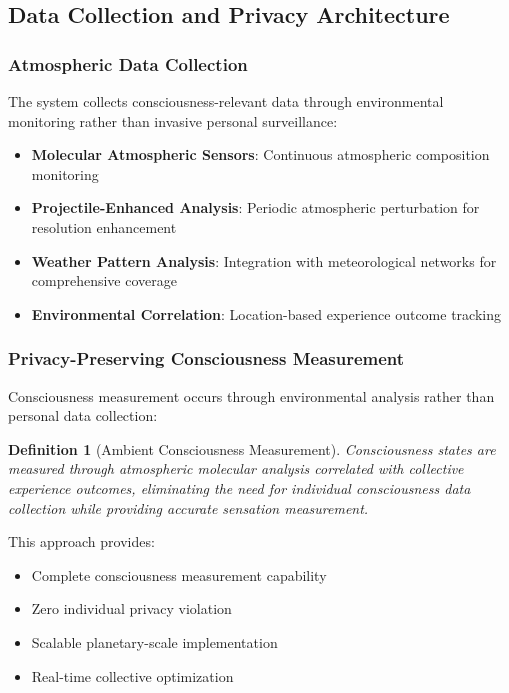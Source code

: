 \documentclass[12pt,a4paper]{article}
\newtheorem{definition}{Definition}
\begin{document}
\subsection{Data Collection and Privacy Architecture}

\subsubsection{Atmospheric Data Collection}

The system collects consciousness-relevant data through environmental monitoring rather than invasive personal surveillance:

\begin{itemize}
\item \textbf{Molecular Atmospheric Sensors}: Continuous atmospheric composition monitoring
\item \textbf{Projectile-Enhanced Analysis}: Periodic atmospheric perturbation for resolution enhancement  
\item \textbf{Weather Pattern Analysis}: Integration with meteorological networks for comprehensive coverage
\item \textbf{Environmental Correlation}: Location-based experience outcome tracking
\end{itemize}

\subsubsection{Privacy-Preserving Consciousness Measurement}

Consciousness measurement occurs through environmental analysis rather than personal data collection:

\begin{definition}[Ambient Consciousness Measurement]
Consciousness states are measured through atmospheric molecular analysis correlated with collective experience outcomes, eliminating the need for individual consciousness data collection while providing accurate sensation measurement.
\end{definition}

This approach provides:
\begin{itemize}
\item Complete consciousness measurement capability
\item Zero individual privacy violation
\item Scalable planetary-scale implementation  
\item Real-time collective optimization
\end{itemize}
\end{document}
